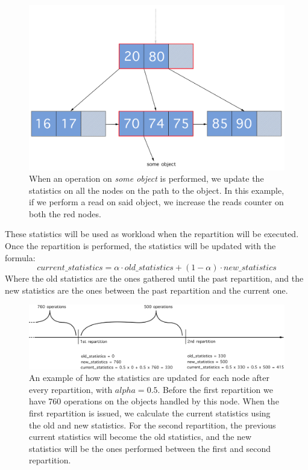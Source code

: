 \begin{figure}[!htb]
  \centering
  \includegraphics[width=\textwidth,height=\textheight,keepaspectratio]{img/b+tree_path.png}
  \caption[caption]{ When an operation on \emph{some object} is performed, we update the statistics on all the nodes on the path to the object. In this example, if we perform a read on said object, we increase the reads counter on both the red nodes.}
  \label{fig:b+tree_path}
\end{figure}

These statistics will be used as workload when the repartition will be executed. Once the repartition is performed, the statistics will be updated with the formula:
$$ current\_statistics = \alpha \cdot old\_statistics + (1-\alpha) \cdot new\_statistics $$
Where the old statistics are the ones gathered until the past repartition, and the new statistics are the ones between the past repartition and the current one.

\begin{figure}[!htb]
  \centering
  \includegraphics[width=\textwidth,height=\textheight,keepaspectratio]{img/statistics.png}
  \caption[caption]{An example of how the statistics are updated for each node after every repartition, with $alpha = 0.5$. Before the first repartition we have 760 operations on the objects handled by this node. When the first repartition is issued, we calculate the current statistics using the old and new statistics. For the second repartition, the previous current statistics will become the old statistics, and the new statistics will be the ones performed between the first and second repartition. }
  \label{fig:statistics}
\end{figure}

